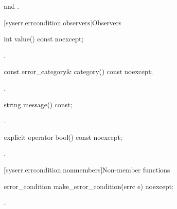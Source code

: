 \begin{itemdescr}
\pnum
\ensures
{} and .
\end{itemdescr}

[syserr.errcondition.observers]{Observers}

%
\begin{itemdecl}
int value() const noexcept;
\end{itemdecl}

\begin{itemdescr}
\pnum
\returns
{}.
\end{itemdescr}

%
\begin{itemdecl}
const error_category& category() const noexcept;
\end{itemdecl}

\begin{itemdescr}
\pnum
\returns
{}.
\end{itemdescr}

%
\begin{itemdecl}
string message() const;
\end{itemdecl}

\begin{itemdescr}
\pnum
\returns
{}.
\end{itemdescr}

%
\begin{itemdecl}
explicit operator bool() const noexcept;
\end{itemdecl}

\begin{itemdescr}
\pnum
\returns
{}.
\end{itemdescr}

[syserr.errcondition.nonmembers]{Non-member functions}

%
\begin{itemdecl}
error_condition make_error_condition(errc e) noexcept;
\end{itemdecl}

\begin{itemdescr}
\pnum
\returns
{}.
\end{itemdescr}

